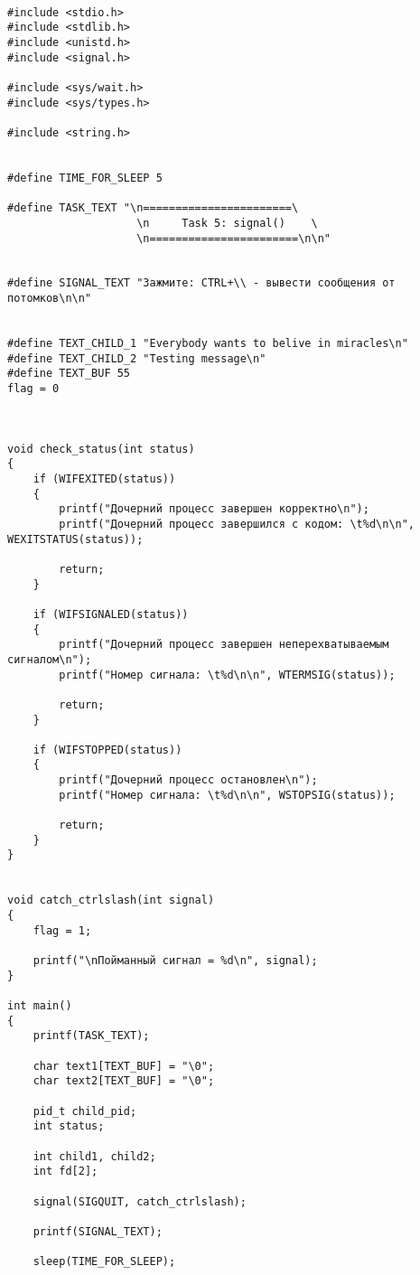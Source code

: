\begin{lstlisting}[style={asm},label=lst:signal,caption=Использование signal()]

#include <stdio.h>
#include <stdlib.h>
#include <unistd.h>
#include <signal.h>

#include <sys/wait.h>
#include <sys/types.h>

#include <string.h>


#define TIME_FOR_SLEEP 5

#define TASK_TEXT "\n=======================\
                    \n     Task 5: signal()    \
                    \n=======================\n\n"


#define SIGNAL_TEXT "Зажмите: СTRL+\\ - вывести сообщения от потомков\n\n"


#define TEXT_CHILD_1 "Everybody wants to belive in miracles\n"
#define TEXT_CHILD_2 "Testing message\n"
#define TEXT_BUF 55
flag = 0



void check_status(int status)
{
    if (WIFEXITED(status))
    {
        printf("Дочерний процесс завершен корректно\n");
        printf("Дочерний процесс завершился с кодом: \t%d\n\n", WEXITSTATUS(status));

        return;
    }

    if (WIFSIGNALED(status))
    {
        printf("Дочерний процесс завершен неперехватываемым сигналом\n");
        printf("Номер сигнала: \t%d\n\n", WTERMSIG(status));

        return;
    }

    if (WIFSTOPPED(status))
    {
        printf("Дочерний процесс остановлен\n");
        printf("Номер сигнала: \t%d\n\n", WSTOPSIG(status));

        return;
    }
}


void catch_ctrlslash(int signal)
{
    flag = 1;

    printf("\nПойманный сигнал = %d\n", signal);
}

int main()
{
    printf(TASK_TEXT);

    char text1[TEXT_BUF] = "\0";
    char text2[TEXT_BUF] = "\0";

    pid_t child_pid;
    int status;

    int child1, child2;
    int fd[2];

    signal(SIGQUIT, catch_ctrlslash);

    printf(SIGNAL_TEXT);

    sleep(TIME_FOR_SLEEP);


\end{lstlisting}
